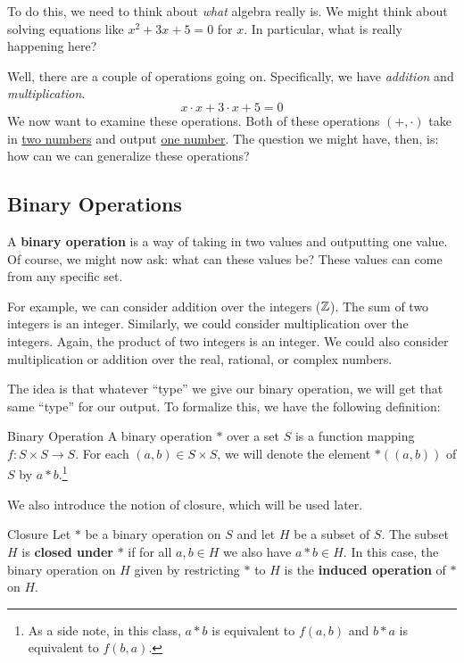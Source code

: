 \documentclass[letterpaper]{article}
\begin{document}
\bigskip 

To do this, we need to think about \emph{what} algebra really is. We might think about solving equations like $x^2 + 3x + 5 = 0$ for $x$. In particular, what is really happening here?

\bigskip 

Well, there are a couple of operations going on. Specifically, we have \emph{addition} and \emph{multiplication}. 
\[x \cdot x + 3 \cdot x + 5 = 0\]
We now want to examine these operations. Both of these operations $(+, \cdot)$ take in \underline{two numbers} and output \underline{one number}. The question we might have, then, is: how can we can generalize these operations?

\subsection{Binary Operations}
A \textbf{binary operation} is a way of taking in two values and outputting one value. Of course, we might now ask: what can these values be? These values can come from any specific set. 

\bigskip 

For example, we can consider addition over the integers ($\mathbb{Z}$). The sum of two integers is an integer. Similarly, we could consider multiplication over the integers. Again, the product of two integers is an integer. We could also consider multiplication or addition over the real, rational, or complex numbers. 

\bigskip 

The idea is that whatever ``type'' we give our binary operation, we will get that same ``type'' for our output. To formalize this, we have the following definition:  
\begin{definition}{Binary Operation}{}
    A binary operation $*$ over a set $S$ is a function mapping $f: S \times S \to S$. For each $(a, b) \in S \times S$, we will denote the element $*((a, b))$ of $S$ by $a * b$.\footnote{As a side note, in this class, $a * b$ is equivalent to $f(a, b)$ and $b * a$ is equivalent to $f(b, a)$.}
\end{definition}

We also introduce the notion of closure, which will be used later. 
\begin{definition}{Closure}{}
    Let $*$ be a binary operation on $S$ and let $H$ be a subset of $S$. The subset $H$ is \textbf{closed under} $*$ if for all $a, b \in H$ we also have $a * b \in H$. In this case, the binary operation on $H$ given by restricting $*$ to $H$ is the \textbf{induced operation} of $*$ on $H$.
\end{definition}
\end{document}
